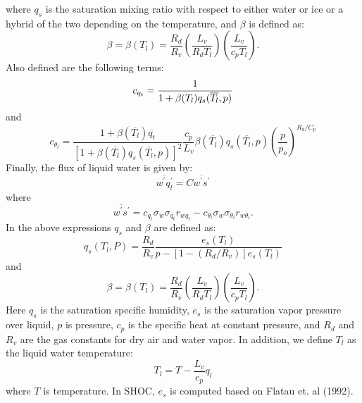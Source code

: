 \documentclass[12pt,titlepage]{article}
\numberwithin{equation}{section}
\begin{document}
%
where $q_{s}$ is the saturation mixing ratio with respect to either water or ice or a hybrid of the two depending on the temperature, and $\beta$ is defined as:
%
\begin{equation}
  \beta=\beta(T_{l})=\frac{R_{d}}{R_{v}}\left(\frac{L_{v}}{R_{d}T_{l}}\right)\left(\frac{L_{v}}{c_{p}T_{l}}\right).
  \label{beta_equation}
\end{equation}
%
Also defined are the following terms:
%
\begin{equation}
  c_{q_{t}}=\frac{1}{1+\beta (T_{l})q_{s}(\overline{T_{l}},p)}\\
  \label{cqt_term}
\end{equation}
%
and
%
\begin{equation}  
  c_{\theta_{l}}=\frac{1+ \beta (\overline{T_{l}})\overline{q_{t}}}{[1+\beta (\overline{T_{l}})q_{s}(\overline{T_{l}},p)]^{2}}\frac{c_{p}}{L_{v}}\beta (\overline{T_{l}}) q_{s}(\overline{T_{l}},p)\left(\frac{p}{p_{o}}\right)^{R_{d}/C_{p}}
  \label{cthl_term}
\end{equation}
%
Finally, the flux of liquid water is given by:
%
\begin{equation}
  \overline{w^{'}q_{l}^{'}}=C\overline{w^{'}s^{'}}
  \label{wql_equation}
\end{equation}
%
where
%
\begin{equation}
  \overline{w^{'}s^{'}}=c_{q_{t}}\sigma_{w}\sigma_{q_{t}}r_{wq_{t}}-c_{\theta_{l}}\sigma_{w}\sigma_{\theta_{l}}r_{w\theta_{l}} .
  \label{wql_s}
\end{equation}
% 
In the above expressions $q_{s}$ and $\beta$ are defined as:
%
\begin{equation}
  q_s (T_{l},P) = \frac{R_{d}}{R_{v}}\frac{e_{s}(T_{l})}{p-[1-(R_{d}/R_{v})]e_{s}(T_{l})}
  \label{qs_equation}
\end{equation}
%
and
%
\begin{equation}
  \beta=\beta(T_{l})=\frac{R_{d}}{R_{v}}\left(\frac{L_{v}}{R_{d}T_{l}}\right)\left(\frac{L_{v}}{c_{p}T_{l}}\right).
  \label{beta_equation}
\end{equation}
%
Here $q_{s}$ is the saturation specific humidity, $e_{s}$ is the saturation vapor pressure over liquid, $p$ is pressure, $c_{p}$ is the specific heat at constant pressure, and $R_{d}$ and $R_{v}$ are the gas constants for dry air and water vapor.  In addition, we define $T_{l}$ as the liquid water temperature:
%
\begin{equation}
  T_{l} = T - \frac{L_{v}}{c_{p}}q_{l}
  \label{T_liq}
\end{equation}
% 
where $T$ is temperature.  In SHOC, $e_{s}$ is computed based on Flatau et. al (1992).  
\end{document}
